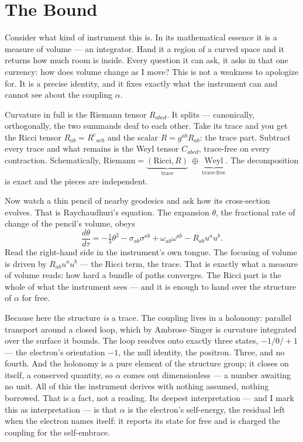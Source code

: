 \chapter{The Bound}

Consider what kind of instrument this is. In its mathematical essence it is a measure of volume --- an integrator.
Hand it a region of a curved space and it returns how much room is inside. Every question it can ask, it asks in that
one currency: how does volume change as I move? This is not a weakness to apologize for. It is a precise identity, and
it fixes exactly what the instrument can and cannot see about the coupling \(\alpha\).

Curvature in full is the Riemann tensor $R_{abcd}$. It splits --- canonically, orthogonally, the two summands deaf to
each other. Take its trace and you get the Ricci tensor $R_{ab}=R^{c}{}_{acb}$ and the scalar $R=g^{ab}R_{ab}$: the
trace part. Subtract every trace and what remains is the Weyl tensor $C_{abcd}$, trace-free on every contraction.
Schematically, $\text{Riemann}=\underbrace{(\text{Ricci},R)}_{\text{trace}}\ \oplus\ \underbrace{\text{Weyl}}_{\text{trace-free}}$.
The decomposition is exact and the pieces are independent.

Now watch a thin pencil of nearby geodesics and ask how its cross-section evolves. That is Raychaudhuri's equation.
The expansion $\theta$, the fractional rate of change of the pencil's volume, obeys
$$\frac{d\theta}{d\tau}=-\tfrac{1}{3}\theta^{2}-\sigma_{ab}\sigma^{ab}+\omega_{ab}\omega^{ab}-R_{ab}u^{a}u^{b}.$$
Read the right-hand side in the instrument's own tongue. The focusing of volume is driven by $R_{ab}u^{a}u^{b}$ ---
the Ricci term, the trace. That is exactly what a measure of volume reads: how hard a bundle of paths converges. The
Ricci part is the whole of what the instrument sees --- and it is enough to hand over the structure of \(\alpha\) for
free.

Because here the structure \emph{is} a trace. The coupling lives in a holonomy: parallel transport around a closed
loop, which by Ambrose--Singer is curvature integrated over the surface it bounds. The loop resolves onto exactly
three states, $-1/0/+1$ --- the electron's orientation $-1$, the null identity, the positron. Three, and no fourth.
And the holonomy is a pure element of the structure group; it closes on itself, a conserved quantity, so \(\alpha\)
comes out dimensionless --- a number awaiting no unit. All of this the instrument derives with nothing assumed,
nothing borrowed. That is a fact, not a reading. Its deepest interpretation --- and I mark this as interpretation ---
is that \(\alpha\) is the electron's self-energy, the residual left when the electron names itself: it reports its
state for free and is charged the coupling for the self-embrace.

